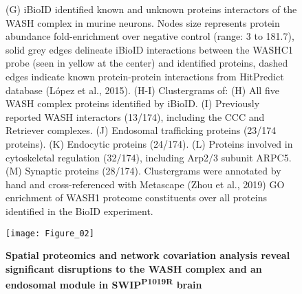 \begin{figure}[!ht]
\begin{fullwidth}
\begin{center}
{		(G) iBioID identified known and unknown proteins interactors of the WASH complex
		in murine neurons. Nodes size represents protein abundance fold-enrichment over
		negative control (range: 3 to 181.7), solid grey edges delineate iBioID
		interactions between the WASHC1 probe (seen in yellow at the center) and
		identified proteins, dashed edges indicate known protein-protein interactions
		from HitPredict database (López et al., 2015). (H-I) Clustergrams of: 
		(H) All five WASH complex proteins identified by iBioID.
		(I) Previously reported WASH interactors (13/174), including the CCC and
		Retriever complexes.
		(J) Endosomal trafficking proteins (23/174 proteins).
		(K) Endocytic proteins (24/174).
		(L) Proteins involved in cytoskeletal regulation (32/174), including Arp2/3
		subunit ARPC5.
		(M) Synaptic proteins (28/174). Clustergrams were annotated by hand and
		cross-referenced with Metascape (Zhou et al., 2019) GO enrichment of WASH1
		proteome constituents over all proteins identified in the BioID experiment.
	}
	\label{fig:fig1}
	\end{center}
	\end{fullwidth}
\end{figure}


\begin{figure}[!ht]
	\begin{fullwidth}
	\begin{center}
	\captionsetup{labelformat=empty}
	\texttt{[image: Figure\_02]}
	\caption{\textbf{Spatial proteomics and network covariation analysis reveal significant
		disruptions to the WASH complex and an endosomal module in
		SWIP\textsuperscript{P1019R} brain}}
	\end{center}
	\end{fullwidth}
\end{figure}

